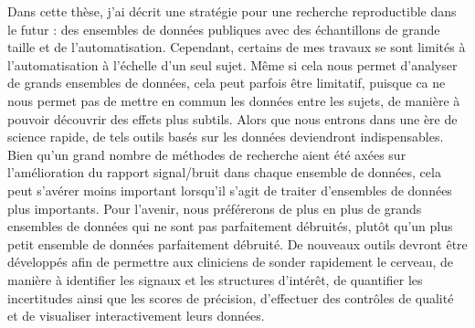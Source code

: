 Dans cette thèse, j'ai décrit une stratégie pour une recherche reproductible dans le futur : des ensembles de données publiques avec des échantillons de grande taille et de l'automatisation. Cependant, certains de mes travaux se sont limités à l'automatisation à l'échelle d'un seul sujet. Même si cela nous permet d'analyser de grands ensembles de données, cela peut parfois être limitatif, puisque ca ne nous permet pas de mettre en commun les données entre les sujets, de manière à pouvoir découvrir des effets plus subtils. Alors que nous entrons dans une ère de science rapide, de tels outils basés sur les données deviendront indispensables. Bien qu'un grand nombre de méthodes de recherche aient été axées sur l'amélioration du rapport signal/bruit dans chaque ensemble de données, cela peut s'avérer moins important lorsqu'il s'agit de traiter d'ensembles de données plus importants. Pour l'avenir, nous préférerons de plus en plus de grands ensembles de données qui ne sont pas parfaitement débruités, plutôt qu'un plus petit ensemble de données parfaitement débruité. De nouveaux outils devront être développés afin de permettre aux cliniciens de sonder rapidement le cerveau, de manière à identifier les signaux et les structures d'intérêt, de quantifier les incertitudes ainsi que les scores de précision, d'effectuer des contrôles de qualité et de visualiser interactivement leurs données.

